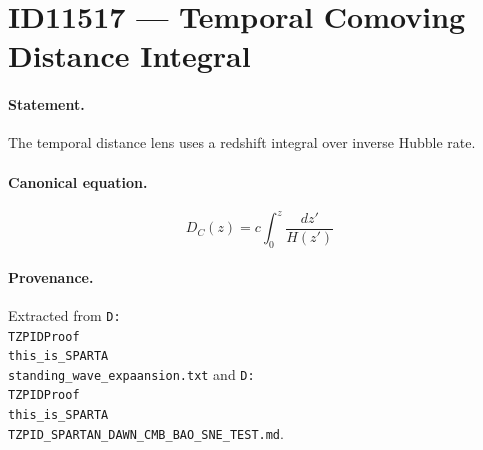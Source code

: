 \section*{ID11517 --- Temporal Comoving Distance Integral}

\paragraph{Statement.}
The temporal distance lens uses a redshift integral over inverse Hubble rate.

\paragraph{Canonical equation.}
\[
D_C(z)=c\int_0^z\frac{dz'}{H(z')}
\]

\paragraph{Provenance.}
Extracted from \texttt{D:\\TZPIDProof\\this\_is\_SPARTA\\standing\_wave\_expaansion.txt} and \texttt{D:\\TZPIDProof\\this\_is\_SPARTA\\TZPID\_SPARTAN\_DAWN\_CMB\_BAO\_SNE\_TEST.md}.
